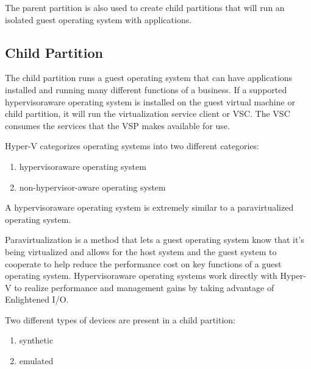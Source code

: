 The parent partition is also used to create child partitions that will run an isolated guest operating system with applications.

\vspace{5mm}
\subsection{Child Partition}
\vspace{5mm}

The child partition \cite{BOOK:1} runs a guest operating system that can have applications installed and running many different functions of a business. If a supported hypervisoraware operating system is installed on the guest virtual machine or child partition, it will run the virtualization service client or VSC. The VSC consumes the services that the VSP makes available for use.

\vspace{5mm}

Hyper-V categorizes operating systems into two different categories:
\begin{enumerate}
	\item hypervisoraware operating system 
	\item non-hypervisor-aware operating system
\end{enumerate}

\vspace{5mm}

A hypervisoraware operating system is extremely similar to a paravirtualized operating system.

\vspace{5mm}

Paravirtualization is a method that lets a guest operating system know that it’s being virtualized and allows for the host system and the guest system to cooperate to help
reduce the performance cost on key functions of a guest operating system. Hypervisoraware operating systems work directly with Hyper-V to realize performance and management gains by taking advantage of Enlightened I/O.

\vspace{5mm}

Two different types of devices are present in a child partition:
\vspace{5mm}
\begin{enumerate}
	\item synthetic
	\item emulated
\end{enumerate}


